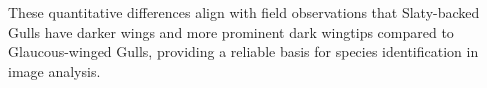 \documentclass[a4paper,12pt]{report}
\begin{document}
These quantitative differences align with field observations that Slaty-backed Gulls have darker wings and more prominent dark wingtips compared to Glaucous-winged Gulls, providing a reliable basis for species identification in image analysis.




\end{document}
